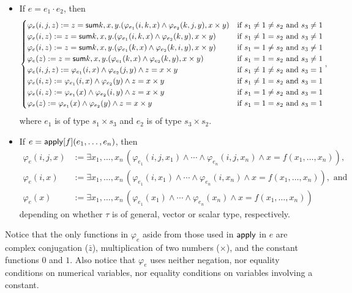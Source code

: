 \begin{itemize}
\item If $e = e_1 \cdot e_2$, then 
\[\begin{cases}
\varphi_e(i,j,z):=z = \mathsf{sum} k,x,y . (\varphi_{e_1}(i,k,x) \land \varphi_{e_2}(k,j,y), x \times y)
 & \text{if } s_1 \neq 1 \neq s_2 \text{ and } s_3 \neq 1
\cr
\varphi_e(i,z):=z = \mathsf{sum} k,x,y . (\varphi_{e_1}(i,k,x) \land \varphi_{e_2}(k,y), x \times y)
& \text{if } s_1 \neq 1 = s_2 \text{ and } s_3 \neq 1
\cr
\varphi_e(i,z):=z = \mathsf{sum} k,x,y . (\varphi_{e_1}(k,x) \land \varphi_{e_2}(k,i,y), x \times y)
  & \text{if } s_1 = 1 \neq s_2 \text{ and } s_3 \neq 1
\cr
\varphi_e(z):=z = \mathsf{sum} k,x,y . (\varphi_{e_1}(k,x) \land \varphi_{e_2}(k,y), x \times y)
 & \text{if } s_1 = 1 = s_2 \text{ and } s_3 \neq 1
\cr
\varphi_e(i,j,z):=\varphi_{e_1}(i,x) \land \varphi_{e_2}(j,y) \land z=x \times y
 & \text{if } s_1 \neq 1 \neq s_2 \text{ and } s_3 = 1
\cr
\varphi_e(i,z):=\varphi_{e_1}(i,x) \land \varphi_{e_2}(y) \land z=x \times y
 & \text{if } s_1 \neq 1 = s_2 \text{ and } s_3 = 1
\cr
\varphi_e(i,z):=\varphi_{e_1}(x) \land \varphi_{e_2}(i,y)\land z=x \times y
 & \text{if } s_1 = 1 \neq s_2 \text{ and } s_3 = 1
\cr
\varphi_e(z):=\varphi_{e_1}(x) \land \varphi_{e_2}(y) \land z=x \times y
 & \text{if } s_1 = 1 = s_2 \text{ and } s_3 = 1
\cr
\end{cases},
\]
where $e_1$ is of type $s_1 \times s_3$ and $e_2$ is of type $s_3 \times s_2$.

\item If $e = \mathsf{apply}[f](e_1,\ldots,e_n)$, then 
\begin{align*}
\varphi_e(i,j,x)&:=\exists x_1,\ldots,x_n\, (\varphi_{e_1}(i,j,x_1)\land \cdots \land \varphi_{e_n}(i,j,x_n)\land x=f(x_1,\ldots,x_n)),\\
\varphi_e(i,x)&:=\exists x_1,\ldots,x_n\, (\varphi_{e_1}(i,x_1)\land \cdots \land \varphi_{e_n}(i,x_n)\land x=f(x_1,\ldots,x_n)), \text{ and}\\
\varphi_e(x)&:=\exists x_1,\ldots,x_n\, (\varphi_{e_1}(x_1)\land \cdots \land \varphi_{e_n}(x_n)\land x=f(x_1,\ldots,x_n))
\end{align*}
depending on whether $\tau$ is of general, vector or scalar type, respectively.
\end{itemize}
Notice that the only functions in $\varphi_e$ aside from those used in $\mathsf{apply}$ in $e$ are complex conjugation ($\bar z$), multiplication of two numbers ($\times$), and the constant functions $0$ and $1$. Also notice that $\varphi_e$ uses neither negation, nor equality conditions on numerical variables, nor equality conditions on variables involving a constant.

